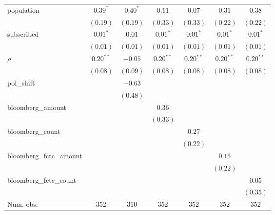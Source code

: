 \begin{table}[!h]
\begin{center}
\begin{tabular}{l c c c c c c }
population              & $0.39^{*}$   & $0.40^{*}$   & $0.11$       & $0.07$       & $0.31$       & $0.38$       \\
                        & $(0.19)$     & $(0.19)$     & $(0.33)$     & $(0.33)$     & $(0.22)$     & $(0.22)$     \\
subscribed              & $0.01^{*}$   & $0.01$       & $0.01^{*}$   & $0.01^{*}$   & $0.01^{*}$   & $0.01^{*}$   \\
                        & $(0.01)$     & $(0.01)$     & $(0.01)$     & $(0.01)$     & $(0.01)$     & $(0.01)$     \\
$\rho$                  & $0.20^{**}$  & $-0.05$      & $0.20^{**}$  & $0.20^{**}$  & $0.20^{**}$  & $0.20^{**}$  \\
                        & $(0.08)$     & $(0.09)$     & $(0.08)$     & $(0.08)$     & $(0.08)$     & $(0.08)$     \\
pol\_shift              &              & $-0.63$      &              &              &              &              \\
                        &              & $(0.48)$     &              &              &              &              \\
bloomberg\_amount       &              &              & $0.36$       &              &              &              \\
                        &              &              & $(0.33)$     &              &              &              \\
bloomberg\_count        &              &              &              & $0.27$       &              &              \\
                        &              &              &              & $(0.22)$     &              &              \\
bloomberg\_fctc\_amount &              &              &              &              & $0.15$       &              \\
                        &              &              &              &              & $(0.22)$     &              \\
bloomberg\_fctc\_count  &              &              &              &              &              & $0.05$       \\
                        &              &              &              &              &              & $(0.35)$     \\
\midrule
Num. obs.               & 352          & 310          & 352          & 352          & 352          & 352          \\

\end{tabular}
\end{center}
\end{table}
